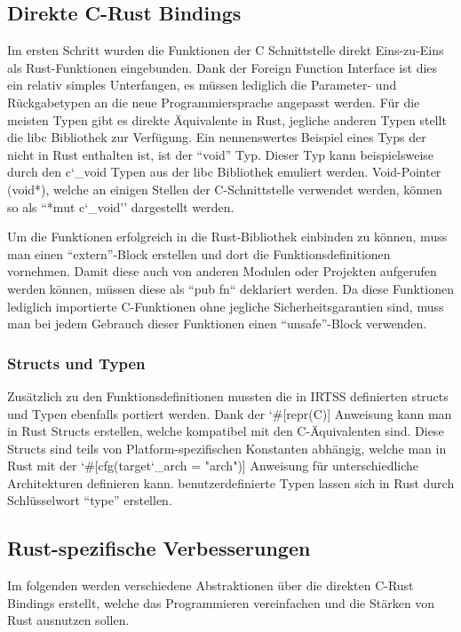 \subsection{Direkte C-Rust Bindings}

Im ersten Schritt wurden die Funktionen der C Schnittstelle direkt Eins-zu-Eins als Rust-Funktionen eingebunden. Dank der
Foreign Function Interface ist dies ein relativ simples Unterfangen, es müssen lediglich die Parameter- und Rückgabetypen
an die neue Programmiersprache angepasst werden. Für die meisten Typen gibt es direkte Äquivalente in Rust, jegliche anderen Typen
stellt die libc Bibliothek zur Verfügung. Ein nennenswertes Beispiel eines Typs der nicht in Rust enthalten ist, ist der
``void'' Typ. Dieser Typ kann beispielsweise durch den c\char`_void Typen aus der libc Bibliothek emuliert werden.
Void-Pointer (void*), welche an einigen Stellen der C-Schnittstelle verwendet werden, können so als ``*mut c\char`_void''
dargestellt werden.

Um die Funktionen erfolgreich in die Rust-Bibliothek einbinden zu können, muss man einen ``extern''-Block erstellen und dort
die Funktionsdefinitionen vornehmen. Damit diese auch von anderen Modulen oder Projekten aufgerufen werden können, müssen diese
als ``pub fn`` deklariert werden. Da diese Funktionen lediglich importierte C-Funktionen ohne jegliche Sicherheitsgarantien
sind, muss man bei jedem Gebrauch dieser Funktionen einen ``unsafe''-Block verwenden.

\subsubsection{Structs und Typen}

Zusätzlich zu den Funktionsdefinitionen mussten die in IRTSS definierten structs und Typen ebenfalls portiert werden.
Dank der \char`#[repr(C)] Anweisung kann man in Rust Structs erstellen, welche kompatibel mit den C-Äquivalenten sind.
Diese Structs sind teils von Platform-spezifischen Konstanten abhängig, welche man in Rust mit der
\char`#[cfg(target\char`_arch = "arch")] Anweisung für unterschiedliche Architekturen definieren kann.
benutzerdefinierte Typen lassen sich in Rust durch Schlüsselwort ``type'' erstellen.

\subsection{Rust-spezifische Verbesserungen}

Im folgenden werden verschiedene Abstraktionen über die direkten C-Rust Bindings erstellt, welche das Programmieren
vereinfachen und die Stärken von Rust ausnutzen sollen.

